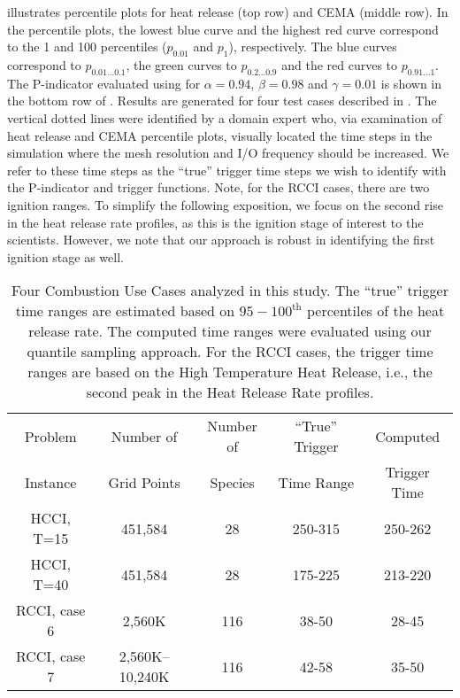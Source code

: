 \documentclass[final]{siamltex}
\newcommand{\pmetric}{P}
\begin{document}
 illustrates percentile plots for heat release (top row) and CEMA
(middle row).  In the percentile plots, the lowest
blue curve and the highest red curve correspond to the 1 and
100 percentiles ($p_{0.01}$ and $p_{1}$), respectively. The blue curves
correspond to $p_{0.01 \ldots 0.1}$, the green curves to $p_{0.2 \ldots 0.9}$
and the red curves to $p_{0.91 \ldots 1}$. 
The \pmetric-indicator evaluated using  for $\alpha=0.94$,
$\beta=0.98$ and $\gamma=0.01$ is shown in the bottom row of . 
Results are generated for four test cases described in .
The vertical dotted lines were identified  by a domain expert who, via examination
of heat release and CEMA percentile plots, visually
located the time steps in the simulation where the mesh resolution and I/O
frequency should  be increased. We refer to these time steps  
as the ``true'' trigger time steps we wish to identify with the 
\pmetric-indicator and trigger functions. Note, for the RCCI cases, there are two ignition ranges.
To simplify the following exposition, we focus on the second rise in the heat release rate
profiles, as this is the ignition stage of interest to the scientists. However,
we note that our approach is robust in identifying the first ignition stage as
well.

\begin{table}[h]
  \caption{\label{tab:usecases} Four Combustion Use Cases analyzed in this
study. The ``true'' trigger time ranges are estimated based on $95-100^{\textrm{th}}$
percentiles of the heat release rate. The computed time ranges were evaluated
using our quantile sampling approach.  For the RCCI cases, the trigger time
ranges are based on the High Temperature Heat Release, i.e., the second peak in
the Heat Release Rate profiles.}
\centering
 \begin{tabular}{|c|c|c|c|c|} 
 \hline
 Problem & Number of & Number of & ``True'' Trigger  & Computed  \\
 Instance & Grid Points & Species & Time Range & Trigger Time \\ \hline\hline
 HCCI, T=15   & 451,584     & 28  & 250-315 & 250-262\\  \hline
 HCCI, T=40   & 451,584     & 28  & 175-225 & 213-220 \\  \hline
 RCCI, case 6 & 2,560K   & 116 & 38-50   & 28-45\\  \hline
 RCCI, case 7 & 2,560K--10,240K   & 116 & 42-58   & 35-50\\  \hline
 \end{tabular}
 \end{table}
\end{document}
